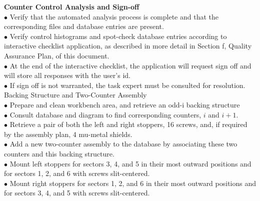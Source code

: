 \textbf{\color[rgb]{1,0.5,0}Counter Control Analysis and Sign-off}\\
$\bullet$ Verify that the automated analysis process is complete and that the corresponding files and database entries are present.\\
$\bullet$ Verify control histograms and spot-check database entries according to interactive checklist application, as described in more detail in Section f, Quality Assurance Plan, of this document.\\
$\bullet$ At the end of the interactive checklist, the application will request sign off and will store all responses with the user's id.\\
$\bullet$ If sign off is not warranted, the task expert must be consulted for resolution. Backing Structure and Two-Counter Assembly\\
$\bullet$ Prepare and clean workbench area, and retrieve an odd-i backing structure\\
$\bullet$ Consult database and diagram to find corresponding counters, $i$ and $i+1$.\\
$\bullet$ Retrieve a pair of both the left and right stoppers, 16 screws, and, if required by the assembly plan, 4 mu-metal shields.\\
$\bullet$ Add a new two-counter assembly to the database by associating these two counters and this backing structure.\\
$\bullet$ Mount left stoppers for sectors 3, 4, and 5 in their most outward positions and for sectors 1, 2, and 6 with screws slit-centered.\\
$\bullet$ Mount right stoppers for sectors 1, 2, and 6 in their most outward positions and for sectors 3, 4, and 5 with screws slit-centered.\\


